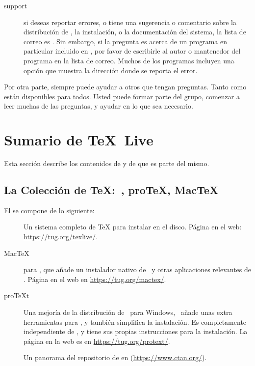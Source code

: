 \documentclass{article}
\begin{document}
\begin{description}
\item [\TL{} support] si deseas reportar errores, o tiene una sugerencia
	o comentario sobre la distribución de \TL{}, la instalación, o
	la documentación del sistema, la lista de correo es
	. Sin embargo, si la pregunta es
	acerca de un programa en particular incluido en \TL{}, por
	favor de escribirle al autor o mantenedor del programa en la
	lista de correo. Muchos de los programas incluyen una opción
	 que muestra la dirección donde se reporta el
	error. 

\end{description}

Por otra parte, siempre puede ayudar a otros que tengan preguntas.
Tanto  como  están disponibles
para todos. Usted puede formar parte del grupo, comenzar a leer muchas
de las preguntas, y ayudar en lo que sea necesario. 


\section{Sumario de \protect\TeX\protect\ Live}
\label{sec:overview-tl}

Esta sección describe los contenidos de \TL{} y de \TK{} que es parte
del mismo.

\subsection{La Colección de \protect\TeX\protect:~\TL{}, pro\TeX{}, Mac\TeX}
\label{sec:tl-coll-dists}

El \TK{} \DVD{} se compone de lo siguiente:

\begin{description}

\item [\TL] Un sistema completo de \TeX{} para instalar en el disco.
	Página en el web: \url{https://tug.org/texlive/}.

\item [Mac\TeX] para \MacOSX, que añade un instalador nativo de
	\MacOSX\ y otras aplicaciones relevantes de \TL{}. Página en
	el web en \url{https://tug.org/mactex/}.

\item [pro\TeX{}t] Una mejoría de la distribución de \MIKTEX\ para
	Windows, \ProTeXt\ añade unas extra herramientas para \MIKTEX,
	y también simplifica la instalación. Es completamente
	independiente de \TL{}, y tiene sus propias instrucciones para
	la instalación. La página en la web es en
	\url{https://tug.org/protext/}.

\item [\CTAN{}] Un panorama del repositorio de \CTAN{} en
	(\url{https://www.ctan.org/}).

\end{description}
\end{document}
